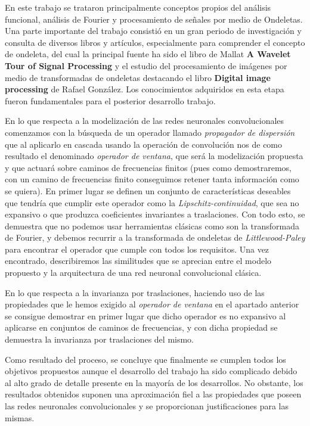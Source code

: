 \medskip
\noindent En este trabajo se trataron principalmente conceptos propios del análisis funcional, análisis de Fourier y procesamiento de señales por medio de Ondeletas. Una parte importante del trabajo consistió en un gran periodo de investigación y consulta de diversos libros y artículos, especialmente para comprender el concepto de ondeleta, del cual la principal fuente ha sido el libro de Mallat \textbf{A Wavelet Tour of Signal Processing} y el estudio del procesamiento de imágenes por medio de transformadas de ondeletas destacando el libro \textbf{Digital image processing} de Rafael González. Los conocimientos adquiridos en esta etapa fueron fundamentales para el posterior desarrollo trabajo.


\medskip

\noindent En lo que respecta a la modelización de las redes neuronales convolucionales comenzamos con la búsqueda de un operador llamado \textit{propagador de dispersión} que al aplicarlo en cascada usando la operación de convolución nos de como resultado el denominado \textit{operador de ventana}, que será la modelización propuesta y que actuará sobre caminos de frecuencias finitos (pues como demostraremos, con un camino de frecuencias finito conseguimos retener tanta información como se quiera). En primer lugar se definen un conjunto de características deseables que tendría que cumplir este operador como la \textit{Lipschitz-continuidad}, que sea no expansivo o que produzca coeficientes invariantes a traslaciones. Con todo esto, se demuestra que no podemos usar herramientas clásicas como son la transformada de Fourier, y debemos recurrir a la transformada de ondeletas de \textit{Littlewood-Paley} para encontrar el operador que cumple con todos los requisitos. Una vez encontrado, describiremos las similitudes que se aprecian entre el modelo propuesto y la arquitectura de una red neuronal convolucional clásica. 

\medskip

\noindent En lo que respecta a la invarianza por traslaciones, haciendo uso de las propiedades que le hemos exigido al \textit{operador de ventana} en el apartado anterior se consigue demostrar en primer lugar que dicho operador es no expansivo al aplicarse en conjuntos de caminos de frecuencias, y con dicha propiedad se demuestra la invarianza por traslaciones del mismo.

\medskip
\noindent Como resultado del proceso, se concluye que finalmente se cumplen todos los objetivos propuestos aunque el desarrollo del trabajo ha sido complicado debido al alto grado de detalle presente en la mayoría de los desarrollos. No obstante, los resultados obtenidos suponen una aproximación fiel a las propiedades que poseen las redes neuronales convolucionales y se proporcionan justificaciones para las mismas.

